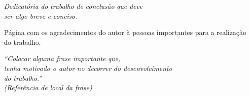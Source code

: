\begin{dedicatoria}
   \vspace*{\fill}
   \centering
   \noindent
   \textit{ Dedicatória do trabalho de conclusão que deve \\
   ser algo breve e conciso.} \vspace*{\fill}
\end{dedicatoria}


\begin{agradecimentos}
Página com os agradecimentos do autor à pessoas importantes para a realização do trabalho.
\end{agradecimentos}

\begin{epigrafe}
    \vspace*{\fill}
	\begin{flushright}
		\textit{``Colocar alguma frase importante que, \\
		tenha motivado o autor no decorrer do desenvolvimento \\
		do trabalho.'' \\
		(Referência de local da frase)}
	\end{flushright}
\end{epigrafe}
